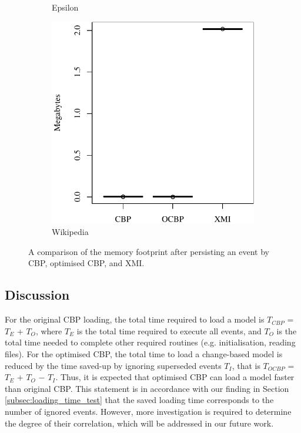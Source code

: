 \begin{figure}[ht]
\begin{subfigure}{0.325\textwidth}
      \caption{Epsilon}
      \label{fig:save_memory_epsilon}
    \end{subfigure}
    \hfill
    \begin{subfigure}{0.325\textwidth}
      \centering
      \includegraphics[width=\linewidth]{images/ol_save_memory_wikipedia}
      \caption{Wikipedia}
      \label{fig:save_memory_wikipedia}
    \end{subfigure}
    \caption{A comparison of the memory footprint after persisting an event by CBP, optimised CBP, and XMI.}
    \label{fig:savememory}
  \end{figure}
  
  \subsection{Discussion}
  \label{sec:discussion}
  For the original CBP loading, the total time required to load a model is $T_{CBP}$ = $T_E$ + $T_O$, where $T_E$ is the total time required to execute all events, and $T_O$ is the total time needed to complete other required routines (e.g. initialisation, reading files). For the optimised CBP, the total time to load a change-based model is reduced by the time saved-up by ignoring superseded events $T_I$, that is $T_{OCBP}$ = $T_E$ + $T_O$ $-$ $T_I$. Thus, it is expected that optimised CBP can load a model faster than original CBP. This statement is in accordance with our finding in Section \ref{subsec:loading_time_test} that the saved loading time corresponds to the number of ignored events. However, more investigation is required to determine the degree of their correlation, which will be addressed in our future work.
  
